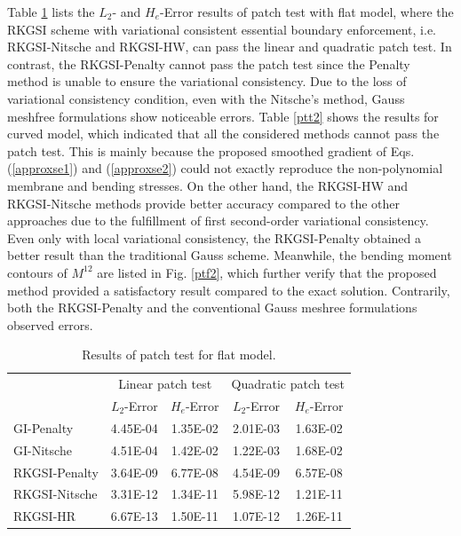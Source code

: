 Table \ref{ptt1} lists the $L_2$- and $H_e$-Error results of patch test with flat model, where the RKGSI scheme with variational consistent essential boundary enforcement, i.e. RKGSI-Nitsche and RKGSI-HW, can pass the linear and quadratic patch test. In contrast, the RKGSI-Penalty cannot pass the patch test since the Penalty method is unable to ensure the variational consistency. Due to the loss of variational consistency condition, even with the Nitsche's method, Gauss meshfree formulations show noticeable errors. Table \ref{ptt2} shows the results for curved model, which indicated that all the considered methods cannot pass the patch test. This is mainly because the proposed smoothed gradient of Eqs. (\ref{approxse1}) and (\ref{approxse2}) could not exactly reproduce the non-polynomial membrane and bending stresses. On the other hand, the RKGSI-HW and RKGSI-Nitsche methods provide better accuracy compared to the other approaches due to the fulfillment of first second-order variational consistency. Even only with local variational consistency, the RKGSI-Penalty obtained a better result than the traditional Gauss scheme. Meanwhile, the bending moment contours of $M^{12}$ are listed in Fig. \ref{ptf2}, which further verify that the proposed method provided a satisfactory result compared to the exact solution. Contrarily, both the RKGSI-Penalty and the conventional Gauss meshree formulations observed errors.

\begin{table}[!ht]
\centering
\caption{Results of patch test for flat model.}\label{ptt1}
\begin{tabular}{lcccc}
\toprule
 & \multicolumn{2}{c}{Linear patch test} & \multicolumn{2}{c}{Quadratic patch test} \\ \cline{2-5}
 & $L_2$-Error & $H_e$-Error & $L_2$-Error & $H_e$-Error \\
    \midrule
    GI-Penalty & 4.45E-04 & 1.35E-02 & 2.01E-03 & 1.63E-02 \\
    GI-Nitsche & 4.51E-04 & 1.42E-02 & 1.22E-03 & 1.68E-02 \\
    RKGSI-Penalty & 3.64E-09 & 6.77E-08 & 4.54E-09 & 6.57E-08 \\
    RKGSI-Nitsche & 3.31E-12 & 1.34E-11 & 5.98E-12 & 1.21E-11 \\
    RKGSI-HR & 6.67E-13 & 1.50E-11 & 1.07E-12 & 1.26E-11 \\
    \bottomrule
\end{tabular}
\end{table}

